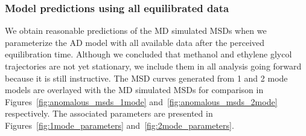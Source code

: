 \documentclass[12pt]{article}
\begin{document}
  
  \subsubsection{Model predictions using all equilibrated data}\label{section:AD_all_data}
  
  We obtain reasonable predictions of the MD simulated MSDs when we parameterize the AD 
  model with all available data after the perceived equilibration time. Although we 
  concluded that methanol and ethylene glycol trajectories are not yet stationary, we 
  include them in all analysis going forward because it is still instructive. 
  The MSD curves generated from 1 and 2 mode models are overlayed with the MD simulated MSDs for 
  comparison in Figures~\ref{fig:anomalous_msds_1mode} and~\ref{fig:anomalous_msds_2mode}
  respectively. The associated parameters are presented in Figures~\ref{fig:1mode_parameters}
  and~\ref{fig:2mode_parameters}.
  
\end{document}
